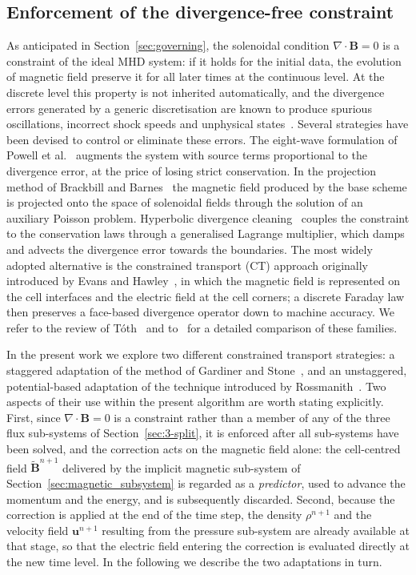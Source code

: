\documentclass[a4paper,fleqn]{cas-sc}
\theoremstyle{definition}
\theoremstyle{remark}
\begin{document}
 

 


\subsection{Enforcement of the divergence-free constraint}
\label{chp:divfree_CT}

As anticipated in Section~\ref{sec:governing}, the solenoidal condition
$\nabla\cdot\mathbf B=0$ is a constraint of the ideal MHD system: if it holds
for the initial data, the evolution of magnetic field preserve it for all
later times at the continuous level. At the discrete level this property is not
inherited automatically, and the divergence errors generated by a generic
discretisation are known to produce spurious oscillations, incorrect shock
speeds and unphysical states~\cite{BrackbillBarnes1980,Toth2000}. Several strategies
have been devised to control or eliminate these errors. The eight-wave
formulation of Powell et al.~\cite{Powell1999} augments the system with source
terms proportional to the divergence error, at the price of losing strict
conservation. In the projection method of Brackbill and
Barnes~\cite{BrackbillBarnes1980} the magnetic field produced by the base scheme is
projected onto the space of solenoidal fields through the solution of an
auxiliary Poisson problem. Hyperbolic divergence cleaning~\cite{Dedner2002}
couples the constraint to the conservation laws through a generalised Lagrange
multiplier, which damps and advects the divergence error towards the
boundaries. The most widely adopted alternative is the constrained transport
(CT) approach originally introduced by Evans and Hawley~\cite{EvansHawley1988}, in
which the magnetic field is represented on the cell interfaces and the electric
field at the cell corners; a discrete Faraday law then preserves a face-based
divergence operator down to machine accuracy. We refer to the review of
T\'oth~\cite{Toth2000} and to~\cite{BalsaraSpicer1999,GardinerStone2005,%
Rossmanith2006} for a detailed comparison of these families.

In the present work we explore two different constrained transport strategies:
a staggered adaptation of the method of Gardiner and Stone~\cite{GardinerStone2005},
and an unstaggered, potential-based adaptation of the technique introduced by
Rossmanith~\cite{Rossmanith2006}. Two aspects of their use within the present
algorithm are worth stating explicitly. First, since $\nabla\cdot\mathbf B=0$ is
a constraint rather than a member of any of the three flux sub-systems of
Section~\ref{sec:3-split}, it is enforced after all sub-systems have been
solved, and the correction acts on the magnetic field alone: the cell-centred
field $\tilde{\mathbf B}^{n+1}$ delivered by the implicit magnetic sub-system of
Section~\ref{sec:magnetic_subsystem} is regarded as a \emph{predictor}, used to advance the
momentum and the energy, and is subsequently discarded. Second, because the
correction is applied at the end of the time step, the density $\rho^{n+1}$ and
the velocity field $\mathbf u^{n+1}$ resulting from the pressure sub-system are
already available at that stage, so that the electric field entering the
correction is evaluated directly at the new time level. In the following we
describe the two adaptations in turn.
\end{document}
